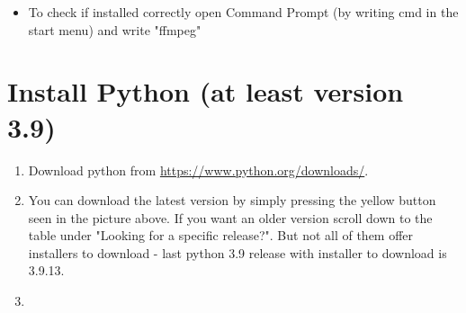\documentclass[a4paper,12pt]{book}
\begin{document}
\begin{enumerate}
\begin{itemize}
\begin{minipage}[t]{\linewidth}
{			}		
			\medskip	
		\end{minipage}
		Click New and paste path to \verb|\ffmpeg\bin| which contains ffmpeg.exe. Then confirm changes by pressing ok. After adding ffmpeg to PATH restart your computer.
		\item To check if installed correctly open Command Prompt (by writing cmd in the start menu) and write "ffmpeg"
	\end{itemize}
\end{enumerate}
\section{Install Python (at least version 3.9)}
\begin{enumerate}
	\item Download python  from \url{https://www.python.org/downloads/}. 
	\item \begin{minipage}[t]{\linewidth}
		\raggedright
		\medskip	
	\end{minipage}
	You can download the latest version by simply pressing the yellow button seen in the picture above. If you want an older version scroll down to the table under "Looking for a specific release?". But not all of them offer installers to download - last python 3.9 release with installer to download is 3.9.13. 
	\item \begin{minipage}[t]{\linewidth}
		\raggedright
\end{minipage}
\end{enumerate}
\end{document}
